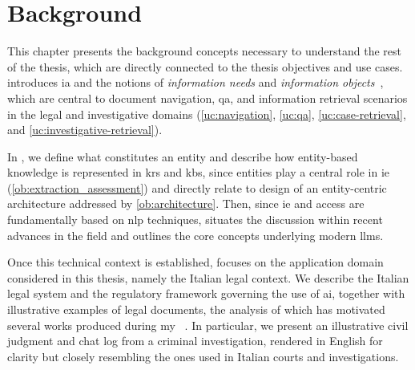 \chapter{Background}
\label{chap:background}




This chapter presents the background concepts necessary to understand the rest of the thesis, which are directly connected to the thesis objectives and use cases.
%
 introduces \acl{ia} and the notions of \emph{information needs} and \emph{information objects}~\cite{entityorientedsearch2018balog}, which are central to document navigation, \acl{qa}, and information retrieval scenarios in the legal and investigative domains (\ref{uc:navigation}, \ref{uc:qa}, \ref{uc:case-retrieval}, and \ref{uc:investigative-retrieval}).

In , we define what constitutes an entity and describe how entity-based knowledge is represented in \aclp{kr} and \aclp{kb}, since entities play a central role in \acl{ie} (\ref{ob:extraction_assessment}) and directly relate to design of an entity-centric architecture addressed by \ref{ob:architecture}.
%
Then, since \acl{ie} and access are fundamentally based on \acf{nlp} techniques,  situates the discussion within recent advances in the field and outlines the core concepts underlying modern \acfp{llm}.

Once this technical context is established,  focuses on the application domain considered in this thesis, namely the Italian legal context. We describe the Italian legal system and the regulatory framework governing the use of \acl{ai}, together with illustrative examples of legal documents, the analysis of which has motivated several works produced during my \phd~\cite{BELLANDI2024,aixia_2023,pozzi_wise_2025}. In particular, we present an illustrative civil judgment and chat log from a criminal investigation, rendered in English for clarity but closely resembling the ones used in Italian courts and investigations.









